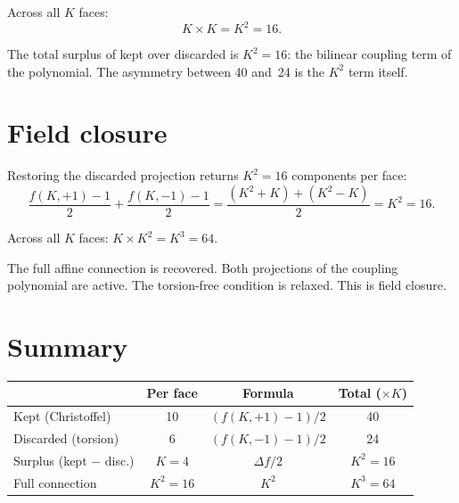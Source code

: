 \documentclass[11pt]{article}
\begin{document}
Across all $K$ faces:
\begin{equation}
  K \times K = K^2 = 16.
  \label{eq:diff_total}
\end{equation}

The total surplus of kept over discarded is $K^2 = 16$: the
bilinear coupling term of the polynomial.  The asymmetry
between 40 and~24 is the $K^2$ term itself.

\section{Field closure}

Restoring the discarded projection returns
$K^2 = 16$ components per face:
\begin{equation}
  \frac{f(K,{+}1) - 1}{2} + \frac{f(K,{-}1) - 1}{2}
  = \frac{(K^2 + K) + (K^2 - K)}{2}
  = K^2 = 16.
  \label{eq:restored}
\end{equation}

Across all $K$ faces: $K \times K^2 = K^3 = 64$.

The full affine connection is recovered.  Both projections of
the coupling polynomial are active.  The torsion-free
condition is relaxed.  This is field closure.

\section{Summary}

\begin{center}
\renewcommand{\arraystretch}{1.3}
\begin{tabular}{lccc}
\hline
  & Per face & Formula & Total ($\times K$) \\
\hline
Kept (Christoffel)
  & 10 & $(f(K,{+}1){-}1)/2$ & 40 \\
Discarded (torsion)
  & 6 & $(f(K,{-}1){-}1)/2$ & 24 \\
Surplus (kept $-$ disc.)
  & $K = 4$ & $\Delta f / 2$ & $K^2 = 16$ \\
Full connection
  & $K^2 = 16$ & $K^2$ & $K^3 = 64$ \\
\hline
\end{tabular}
\end{center}

\medskip
\end{document}
